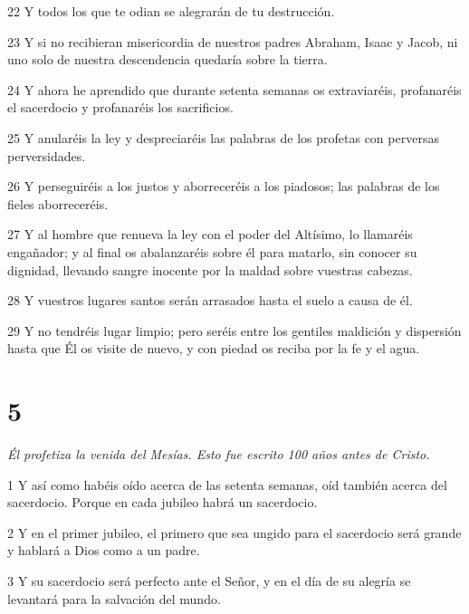\par 22 Y todos los que te odian se alegrarán de tu destrucción.

\par 23 Y si no recibieran misericordia de nuestros padres Abraham, Isaac y Jacob, ni uno solo de nuestra descendencia quedaría sobre la tierra.

\par 24 Y ahora he aprendido que durante setenta semanas os extraviaréis, profanaréis el sacerdocio y profanaréis los sacrificios.

\par 25 Y anularéis la ley y despreciaréis las palabras de los profetas con perversas perversidades.

\par 26 Y perseguiréis a los justos y aborreceréis a los piadosos; las palabras de los fieles aborreceréis.

\par 27 Y al hombre que renueva la ley con el poder del Altísimo, lo llamaréis engañador; y al final os abalanzaréis sobre él para matarlo, sin conocer su dignidad, llevando sangre inocente por la maldad sobre vuestras cabezas.

\par 28 Y vuestros lugares santos serán arrasados ​​hasta el suelo a causa de él.

\par 29 Y no tendréis lugar limpio; pero seréis entre los gentiles maldición y dispersión hasta que Él os visite de nuevo, y con piedad os reciba por la fe y el agua.

\chapter{5}

\par \textit{Él profetiza la venida del Mesías. Esto fue escrito 100 años antes de Cristo.}

\par 1 Y así como habéis oído acerca de las setenta semanas, oíd también acerca del sacerdocio. Porque en cada jubileo habrá un sacerdocio.

\par 2 Y en el primer jubileo, el primero que sea ungido para el sacerdocio será grande y hablará a Dios como a un padre.

\par 3 Y su sacerdocio será perfecto ante el Señor, y en el día de su alegría se levantará para la salvación del mundo.

